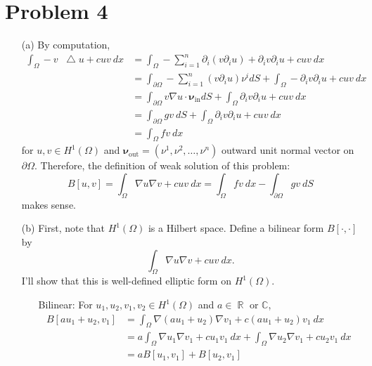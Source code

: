 \documentclass{article}
\DeclareMathOperator{\rr}{\mathbb{R}}
\newcommand*\Laplace{\mathop{}\!\mathbin\bigtriangleup}
\begin{document}
\section*{Problem 4}
\begin{enumerate}
\item[(a)] By computation,
\begin{equation*}
\begin{split}
\int_\Omega -v\Laplace u+cuv~dx&=\int_\Omega -\sum\limits_{i=1}^n \partial_i (v\partial_i u)+\partial_i v \partial_i u+cuv~dx \\
&=\int_{\partial \Omega} -\sum\limits_{i=1}^n \left(v\partial_i u\right)\nu^i dS+\int_\Omega -\partial_i v \partial_i u+cuv~dx \\
&=\int_{\partial \Omega} v\nabla u \cdot \bm{\nu}_{\text{in}}dS+\int_\Omega \partial_i v \partial_i u+cuv~dx \\
&=\int_{\partial \Omega} gv~dS+\int_\Omega \partial_i v \partial_i u+cuv~dx \\
&=\int_\Omega fv~dx
\end{split}
\end{equation*}
for $u,v\in H^1(\Omega)$ and $\bm{\nu}_{\text{out}}=(\nu^1,\nu^2, \ldots, \nu^n)$ outward unit normal vector on $\partial \Omega$. Therefore, the definition of weak solution of this problem:
\begin{equation*}
B[u,v]=\int_\Omega \nabla u \nabla v + cuv~dx=\int_\Omega fv~dx-\int_{\partial \Omega} gv~dS
\end{equation*}
makes sense.
\item[(b)] First, note that $H^1(\Omega)$ is a Hilbert space. Define a bilinear form $B[\cdot,\cdot]$ by
\begin{equation*}
\int_\Omega \nabla u \nabla v + cuv~dx.
\end{equation*}
I'll show that this is well-defined elliptic form on $H^1(\Omega)$.
\begin{enumerate}
\item[Bilinear:] For $u_1,u_2,v_1, v_2\in H^1(\Omega)$ and $a\in \rr$ or $\mathbb{C}$,
\begin{equation*}
\begin{split}
B[au_1+u_2,v_1]&=\int_\Omega \nabla (au_1+u_2) \nabla v_1 + c(au_1+u_2)v_1~dx\\
&=a\int_\Omega \nabla u_1\nabla v_1 + c u_1v_1~dx+\int_\Omega \nabla u_2 \nabla v_1 + cu_2v_1~dx\\
&=aB[u_1,v_1]+B[u_2,v_1]
\end{split}
\end{equation*}

\end{enumerate}
\end{enumerate}
\end{document}
